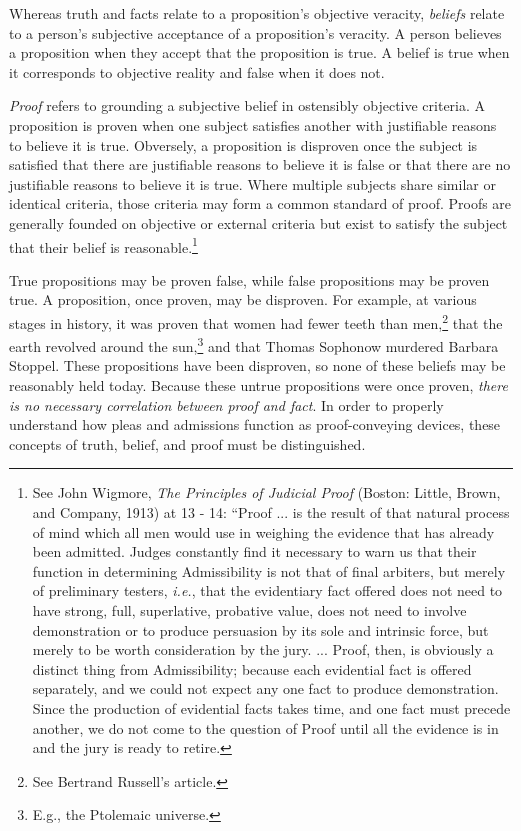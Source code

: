 Whereas truth and facts relate to a proposition's objective veracity, \textit{beliefs} relate to a person's subjective acceptance of a proposition's veracity. A person believes a proposition when they accept that the proposition is true. A belief is true when it corresponds to objective reality and false when it does not.  

\textit{Proof} refers to grounding a subjective belief in ostensibly objective criteria. A proposition is proven when one subject satisfies another with justifiable reasons to believe it is true. Obversely, a proposition is disproven once the subject is satisfied that there are justifiable reasons to believe it is false or that there are no justifiable reasons to believe it is true. Where multiple subjects share similar or identical criteria, those criteria may form a common standard of proof. Proofs are generally founded on objective or external criteria but exist to satisfy the subject that their belief is reasonable.\footnote{See John Wigmore, \textit{The Principles of Judicial Proof} (Boston: Little, Brown, and Company, 1913) at 13 - 14: ``Proof ... is the result of that natural process of mind which all men would use in weighing the evidence that has already been admitted. Judges constantly find it necessary to warn us that their function in determining Admissibility is not that of final arbiters, but merely of preliminary testers, \textit{i.e.}, that the evidentiary fact offered does not need to have strong, full, superlative, probative value, does not need to involve demonstration or to produce persuasion by its sole and intrinsic force, but merely to be worth consideration by the jury. ... Proof, then, is obviously a distinct thing from Admissibility; because each evidential fact is offered separately, and we could not expect any one fact to produce demonstration. Since the production of evidential facts takes time, and one fact must precede another, we do not come to the question of Proof until all the evidence is in and the jury is ready to retire.}

True propositions may be proven false, while false propositions may be proven true. A proposition, once proven, may be disproven. For example, at various stages in history, it was proven that women had fewer teeth than men,\footnote{See Bertrand Russell's article.} that the earth revolved around the sun,\footnote{E.g., the Ptolemaic universe.} and that Thomas Sophonow murdered Barbara Stoppel. These propositions have been disproven, so none of these beliefs may be reasonably held today. Because these untrue propositions were once proven, \textit{there is no necessary correlation between proof and fact}. In order to properly understand how pleas and admissions function as proof-conveying devices, these concepts of truth, belief, and proof must be distinguished.

